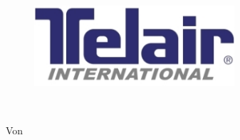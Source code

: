 \begin{titlepage}
\pagestyle{empty}

\begin{figure}[ht]
\includegraphics[height=3cm]{pictures/logo.jpg}
\end{figure}

\begin{center}
\vspace{1cm}
\begin{onehalfspace}
{\fontsize{22}{26} \selectfont \textbf{\docTitle}}\\[5mm]
{\fontsize{18}{22} \selectfont \docUntertitle}


\end{onehalfspace}
\end{center}

    \begin{center}
        Von \docVorname~\docNachname\\
 	    \docAbgabedatum
    \end{center}
\end{titlepage}


